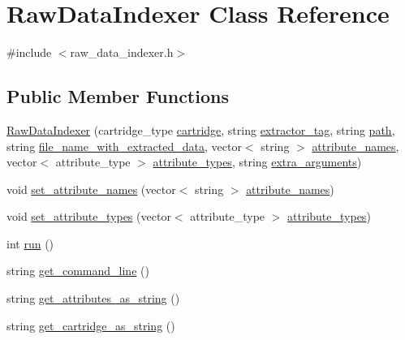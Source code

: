 \hypertarget{classRawDataIndexer}{}\section{Raw\+Data\+Indexer Class Reference}
\label{classRawDataIndexer}


{\ttfamily \#include $<$raw\+\_\+data\+\_\+indexer.\+h$>$}

\subsection*{Public Member Functions}
\begin{DoxyCompactItemize}
\item 
\hyperlink{classRawDataIndexer_a9ed3a0de9e412d560b7a04d77d56bc74}{Raw\+Data\+Indexer} (cartridge\+\_\+type \hyperlink{classRawDataIndexer_a97457b9fd1fd60fc392e7c482c9291b8}{cartridge}, string \hyperlink{classRawDataIndexer_a1cd177b09d6617a3cc4977baa9720e23}{extractor\+\_\+tag}, string \hyperlink{classRawDataIndexer_a5b18b073d000aa553ef7967b6aef857a}{path}, string \hyperlink{classRawDataIndexer_a31ec597c4f1d93cea6c84aefd1c5b5ab}{file\+\_\+name\+\_\+with\+\_\+extracted\+\_\+data}, vector$<$ string $>$ \hyperlink{classRawDataIndexer_a6ebb8467c0e46140a87261ae569d1cec}{attribute\+\_\+names}, vector$<$ attribute\+\_\+type $>$ \hyperlink{classRawDataIndexer_aa9b5a06fe603ed2e0b2c1b7cdf0b704a}{attribute\+\_\+types}, string \hyperlink{classRawDataIndexer_a119dc6915990b3383d131fef420aac07}{extra\+\_\+arguments})
\item 
void \hyperlink{classRawDataIndexer_aa962af15635109bdfaa1ca149cad7887}{set\+\_\+attribute\+\_\+names} (vector$<$ string $>$ \hyperlink{classRawDataIndexer_a6ebb8467c0e46140a87261ae569d1cec}{attribute\+\_\+names})
\item 
void \hyperlink{classRawDataIndexer_ac3cf69ec86637166f910c56ac1330378}{set\+\_\+attribute\+\_\+types} (vector$<$ attribute\+\_\+type $>$ \hyperlink{classRawDataIndexer_aa9b5a06fe603ed2e0b2c1b7cdf0b704a}{attribute\+\_\+types})
\item 
int \hyperlink{classRawDataIndexer_a47cc119f8c67189c91115531e459b66b}{run} ()
\item 
string \hyperlink{classRawDataIndexer_aa53e5ae397182f0204253f25c0d36e66}{get\+\_\+command\+\_\+line} ()
\item 
string \hyperlink{classRawDataIndexer_a2d51ec01132b9bc76e0b84197e8da7f5}{get\+\_\+attributes\+\_\+as\+\_\+string} ()
\item 
string \hyperlink{classRawDataIndexer_ac28695c011c1239763307a60d37c6c7f}{get\+\_\+cartridge\+\_\+as\+\_\+string} ()
\end{DoxyCompactItemize}
